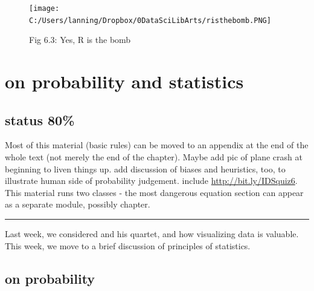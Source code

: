 \documentclass[
  openany]{book}
\begin{document}
\begin{figure}
\centering
\texttt{[image: C:/Users/lanning/Dropbox/0DataSciLibArts/risthebomb.PNG]}
\caption{Fig 6.3: Yes, R is the bomb}
\end{figure}

\hypertarget{on-probability-and-statistics}{%
\chapter{on probability and statistics}\label{on-probability-and-statistics}}

\hypertarget{status-80-1}{%
\section*{status 80\%}\label{status-80-1}}

Most of this material (basic rules) can be moved to an appendix at the end of the whole text (not merely the end of the chapter). Maybe add pic of plane crash at beginning to liven things up. add discussion of biases and heuristics, too, to illustrate human side of probability judgement. include \url{http://bit.ly/IDSquiz6}. This material runs two classes - the most dangerous equation section can appear as a separate module, possibly chapter.

\begin{center}\rule{0.5\linewidth}{\linethickness}\end{center}

Last week, we considered \citet{anscombe1973graphs} and his quartet, and how visualizing data is valuable. This week, we move to a brief discussion of principles of statistics.

\hypertarget{on-probability}{%
\section{on probability}\label{on-probability}}
\end{document}
